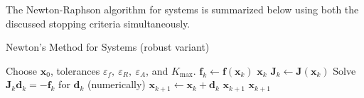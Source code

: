 The Newton-Raphson algorithm for systems is summarized below using both the discussed stopping criteria simultaneously.

\begin{algorithm}[H]
    \caption{Newton's Method for Systems (robust variant)}
    \begin{algorithmic}[1]
    \State Choose $\mathbf{x}_0$, tolerances $\varepsilon_f,\ \varepsilon_R,\ \varepsilon_A$, and $K_{\max}$.
        \State $\mathbf{f}_k \gets \mathbf{f}(\mathbf{x}_k)$
            \State \Return $\mathbf{x}_k$ 
        \EndIf
        \State $\mathbf{J}_k \gets \mathbf{J}(\mathbf{x}_k)$
        \State Solve $\mathbf{J}_k \mathbf{d}_k = -\mathbf{f}_k$ for $\mathbf{d}_k$ (numerically)
        \State $\mathbf{x}_{k+1} \gets \mathbf{x}_k + \mathbf{d}_k$
            \State \Return $\mathbf{x}_{k+1}$ 
        \EndIf
    \EndFor
    \State \Return $\mathbf{x}_{k+1}$ 
    \end{algorithmic}
\end{algorithm}

